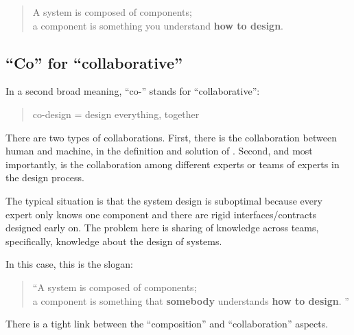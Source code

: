 \begin{quote}
    A system is composed of components;\\
    a component is something you understand
    \textbf{how to design}.
\end{quote}

\subsection{``Co'' for ``collaborative''}

In a second broad meaning, ``co-'' stands for ``collaborative'':

\begin{quote}
    co-design = design everything, together
\end{quote}

There are two types of collaborations.
First, there is the collaboration between human and machine, in the definition and solution of .
Second, and most importantly, is the collaboration among different experts or teams of experts in the design process.

The typical situation is that the system design is suboptimal because every expert only knows one component and there are rigid interfaces/contracts designed early on.
The problem here is sharing of knowledge across teams, specifically, knowledge about the design of systems.

In this case, this is the slogan:

\begin{quote}
    \enquote{A system is composed of components;\\
        a component is something that \textbf{somebody} understands
        \textbf{how to design}.
    }
\end{quote}

There is a tight link between the ``composition'' and ``collaboration'' aspects.



